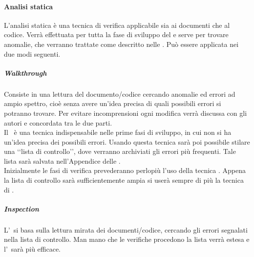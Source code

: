		\paragraph{Analisi statica}
		L'analisi statica è una tecnica di verifica applicabile sia ai documenti che al codice. Verrà effettuata per tutta la fase di sviluppo del  e serve per trovare anomalie, che verranno trattate come descritto nelle \NPdoc. Può essere applicata nei due modi seguenti.
			\subparagraph{Walkthrough}
			Consiste in una lettura del documento/codice cercando anomalie ed errori ad ampio spettro, cioè senza avere un'idea precisa di quali possibili errori si potranno trovare. Per evitare incomprensioni ogni modifica verrà discussa con gli autori e concordata tra le due parti. \\
			Il \ è una tecnica indispensabile nelle prime fasi di sviluppo, in cui non si ha un'idea precisa dei possibili errori. Usando questa tecnica sarà poi possibile stilare una ‘‘lista di controllo’’, dove verranno archiviati gli errori più frequenti. Tale lista sarà salvata nell'Appendice delle \NPdoc. \\ %
			Inizialmente le fasi di verifica prevederanno perlopiù l'uso della tecnica . Appena la lista di controllo sarà sufficientemente ampia si userà sempre di più la tecnica di .
			\subparagraph{Inspection}
			L'\ si basa sulla lettura mirata dei documenti/codice, cercando gli errori segnalati nella lista di controllo. Man mano che le verifiche procedono la lista verrà estesa e l'\ sarà più efficace.

